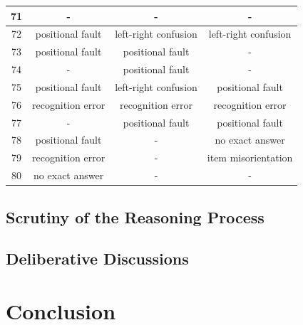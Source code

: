 \documentclass[journal,10pt]{IEEEtran}
\begin{document}
\begin{table}[ht]
{\begin{tabular}{|c|c|c|c|}
    71              & -                                 & -                    & -                                 \\ \hline
    72              & positional fault                 & left-right confusion & left-right confusion              \\ \hline
    73              & positional fault                 & positional fault    & -                                 \\ \hline
    74              & -                                 & positional fault    & -                                 \\ \hline
    75              & positional fault                 & left-right confusion & positional fault                 \\ \hline
    76              & recognition error                 & recognition error    & recognition error                 \\ \hline
    77              & -                                 & positional fault    & positional fault                 \\ \hline
    78              & positional fault                 & -                    & no exact answer                   \\ \hline
    79              & recognition error                 & -                    & item misorientation               \\ \hline
    80              & no exact answer                   & -                    & -                                 \\ \hline
    \end{tabular}%
    }
\end{table}
\subsection{Scrutiny of the Reasoning Process}

\subsection{Deliberative Discussions}

\section{Conclusion}




\appendices

\label{Chart}
\clearpage

\label{Easy}

\label{Hard}
\end{document}
